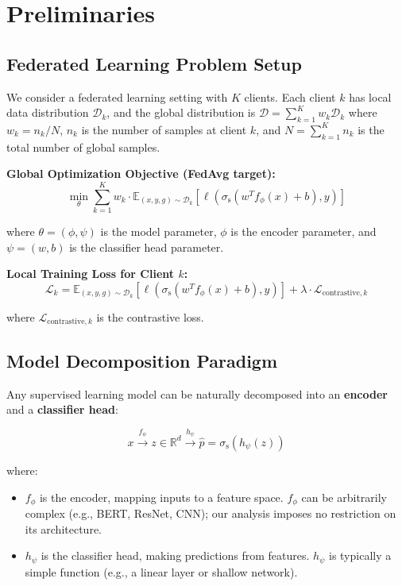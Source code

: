 \documentclass[11pt]{article}
\begin{document}
\section{Preliminaries}

\subsection{Federated Learning Problem Setup}

We consider a federated learning setting with $K$ clients. Each client $k$ has local data distribution $\mathcal{D}_k$, and the global distribution is $\mathcal{D} = \sum_{k=1}^K w_k \mathcal{D}_k$ where $w_k = n_k / N$, $n_k$ is the number of samples at client $k$, and $N = \sum_{k=1}^K n_k$ is the total number of global samples.

\textbf{Global Optimization Objective (FedAvg target):}
$$\min_{\theta} \sum_{k=1}^K w_k \cdot \mathbb{E}_{(x,y,g) \sim \mathcal{D}_k} \left[ \ell(\sigma_{\text{s}}(w^T f_\phi(x) + b), y) \right]$$

where $\theta = (\phi, \psi)$ is the model parameter, $\phi$ is the encoder parameter, and $\psi = (w, b)$ is the classifier head parameter.

\textbf{Local Training Loss for Client $k$:}
$$\mathcal{L}_k = \mathbb{E}_{(x,y,g) \sim \mathcal{D}_k} \left[ \ell(\sigma_{\text{s}}(w^T f_\phi(x) + b), y) \right] + \lambda \cdot \mathcal{L}_{\mathrm{contrastive},k}$$

where $\mathcal{L}_{\mathrm{contrastive},k}$ is the contrastive loss.

\subsection{Model Decomposition Paradigm}

Any supervised learning model can be naturally decomposed into an \textbf{encoder} and a \textbf{classifier head}:

$$x \xrightarrow{f_\phi} z \in \mathbb{R}^d \xrightarrow{h_\psi} \hat{p} = \sigma_{\text{s}}(h_\psi(z))$$

where:
\begin{itemize}
    \item $f_\phi$ is the encoder, mapping inputs to a feature space. $f_\phi$ can be arbitrarily complex (e.g., BERT, ResNet, CNN); our analysis imposes no restriction on its architecture.
    \item $h_\psi$ is the classifier head, making predictions from features. $h_\psi$ is typically a simple function (e.g., a linear layer or shallow network).
\end{itemize}
\end{document}
